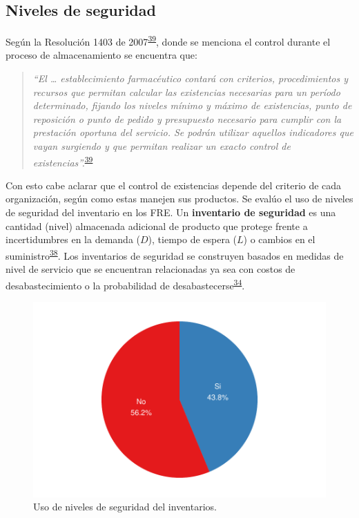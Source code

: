 \documentclass[
  oneside]{book}
\begin{document}
\hypertarget{niveles-de-seguridad}{%
\subsection{Niveles de seguridad}\label{niveles-de-seguridad}}

Según la Resolución 1403 de 2007\textsuperscript{\protect\hyperlink{ref-MinisteriodeSaludyProteccionSocial2007}{39}}, donde se menciona el control durante el proceso de almacenamiento se encuentra que:

\begin{quote}
\emph{``El \ldots{} establecimiento farmacéutico contará con criterios, procedimientos y recursos que permitan calcular las existencias necesarias para un período determinado, fijando los niveles mínimo y máximo de existencias, punto de reposición o punto de pedido y presupuesto necesario para cumplir con la prestación oportuna del servicio. Se podrán utilizar aquellos indicadores que vayan surgiendo y que permitan realizar un exacto control de existencias''.}\textsuperscript{\protect\hyperlink{ref-MinisteriodeSaludyProteccionSocial2007}{39}}
\end{quote}

Con esto cabe aclarar que el control de existencias depende del criterio de cada organización, según como estas manejen sus productos. Se evalúo el uso de niveles de seguridad del inventario en los FRE. Un \textbf{inventario de seguridad} es una cantidad (nivel) almacenada adicional de producto que protege frente a incertidumbres en la demanda (\(D\)), tiempo de espera (\(L\)) o cambios en el suministro\textsuperscript{\protect\hyperlink{ref-Krajewski2016}{38}}. Los inventarios de seguridad se construyen basados en medidas de nivel de servicio que se encuentran relacionadas ya sea con costos de desabastecimiento o la probabilidad de desabastecerse\textsuperscript{\protect\hyperlink{ref-Silver2017}{34}}.

\begin{figure}

{\centering \includegraphics[width=0.78\linewidth]{InformeFinal_files/figure-latex/UsoNivelesSeguridad-1} 

}

\caption{Uso de niveles de seguridad del inventarios.}\label{fig:UsoNivelesSeguridad}
\end{figure}
\end{document}
